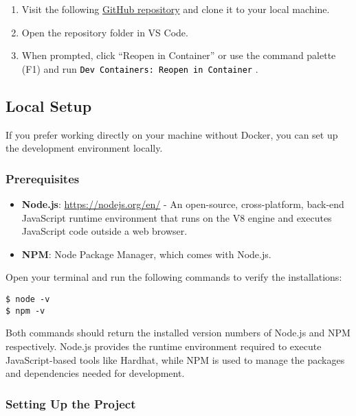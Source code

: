 \documentclass[12pt]{article}
\newcommand{\codegrey}[1]{%
  \texttt{\colorbox{black!4}{\textcolor{black}{#1}}}%
}
\begin{document}
\begin{enumerate}
  \item Visit the following \href{https://github.com/radovluk/Smart-Contract-Exercise/tree/main/02-Decentralized-Voting-System/task/task-code}{GitHub repository} and clone it to your local machine.
  \item Open the repository folder in VS Code.
  \item When prompted, click ``Reopen in Container'' or use the command palette (F1) and run \codegrey{Dev Containers: Reopen in Container}.
\end{enumerate}

\subsection{Local Setup}

If you prefer working directly on your machine without Docker, you can set up the development environment locally.

\subsubsection*{Prerequisites}
\begin{itemize}
    \item \textbf{Node.js}: \url{https://nodejs.org/en/} - An open-source, cross-platform, back-end JavaScript runtime environment that runs on the V8 engine and executes JavaScript code outside a web browser.
    \item \textbf{NPM}: Node Package Manager, which comes with Node.js.
\end{itemize}

\noindent
Open your terminal and run the following commands to verify the installations:

\begin{verbatim}
$ node -v
$ npm -v
\end{verbatim}

Both commands should return the installed version numbers of Node.js and NPM respectively. Node.js provides the runtime environment required to execute JavaScript-based tools like Hardhat, while NPM is used to manage the packages and dependencies needed for development.

\subsubsection*{Setting Up the Project}
\end{document}
